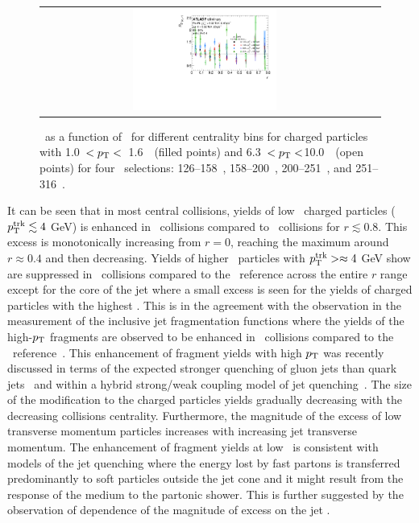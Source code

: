 \begin{figure}
{\begin{tabular}{cc}
	 \includegraphics[width=0.45\textwidth]{figures_results/RDpT_final_ratio_dR_CONF_data_trk_cent5} \\
\end{tabular} }
   \caption{\RDptr\ as a function of \rvar\ for different centrality bins for charged particles with 1.0~$< p_{\mathrm{T}} <$~1.6~\GeV\
(filled points) and 6.3~$< p_{\mathrm{T}} <$10.0~\GeV\ (open points) for four \ptjet\ selections: 126--158~\GeV, 158--200~\GeV,
200--251~\GeV, and 251--316~\GeV.}
      \label{fig:ptjetdep}
\end{figure}





It can be seen that in most central collisions, yields of low \pt\ charged particles ($\mbox{$p_{\mathrm{T}}^{\mathrm{trk}}$} \lesssim 4$ GeV) is enhanced in \PbPb\ collisions compared to \pp\ collisions for $r \lesssim 0.8$. This excess is monotonically increasing from $r=0$, reaching the maximum around $r\approx0.4$ and then decreasing. Yields of higher \pt\ particles with $\mbox{$p_{\mathrm{T}}^{\mathrm{trk}}$} > \approx 4$ GeV show are suppressed in \PbPb\ collisions compared to the \pp\ reference across the entire $r$ range except for the core of the jet where a small excess is seen for the yields of charged particles with the highest \pT. This is in the agreement with the observation in the measurement of the inclusive jet fragmentation functions where the yields of the high-$p_{\mathrm{T}}$ fragments are observed to be enhanced in \PbPb\ collisions compared to the \pp\ reference~\cite{ATLAS502FFConf}. This enhancement of fragment yields with high $p_{\mathrm{T}}$ was recently discussed in terms of the expected stronger quenching of  gluon jets than quark jets~\cite{Spousta:2015fca} and within a hybrid strong/weak coupling model of jet quenching~\cite{Hulcher:2017cpt}.  The size of the modification to the charged particles yields gradually decreasing with the  decreasing collisions centrality. Furthermore, the magnitude of the excess of low transverse momentum particles increases with increasing jet transverse momentum. The enhancement of fragment yields at low \pT\ is consistent with models of the jet quenching where the energy lost by fast partons is transferred predominantly to soft particles outside the jet cone and it might result from the response of the medium to the partonic shower. This is further suggested by the observation of dependence of the magnitude of excess on the jet \pt.




